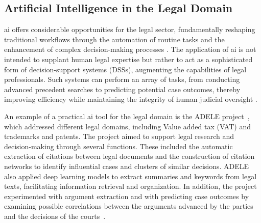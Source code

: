 
\subsection{Artificial Intelligence in the Legal Domain}
\label{sec:background:ai4legal}

\ac{ai} offers considerable opportunities for the legal sector, fundamentally reshaping traditional workflows through the automation of routine tasks and the enhancement of complex decision-making processes \cite{juliahb2024}. The application of \ac{ai} is not intended to supplant human legal expertise but rather to act as a sophisticated form of decision-support systems (DSSs), augmenting the capabilities of legal professionals. Such systems can perform an array of tasks, from conducting advanced precedent searches to predicting potential case outcomes, thereby improving efficiency while maintaining the integrity of human judicial oversight \cite{juliahb2024}.

An example of a practical \ac{ai} tool for the legal domain is the ADELE project~\cite{galli2024analytics}, which addressed different legal domains, including Value added tax (VAT) and trademarks and patents. The project aimed to support legal research and decision-making through several functions. These included the automatic extraction of citations between legal documents and the construction of citation networks to identify influential cases and clusters of similar decisions. ADELE also applied deep learning models to extract summaries and keywords from legal texts, facilitating information retrieval and organization. In addition, the project experimented with argument extraction and with predicting case outcomes by examining possible correlations between the arguments advanced by the parties and the decisions of the courts~\cite{juliahb2024}.

